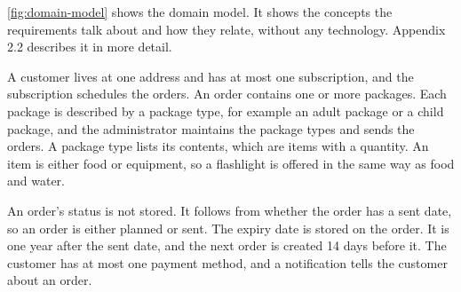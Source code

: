 \autoref{fig:domain-model} shows the domain model. It shows the concepts the
requirements talk about and how they relate, without any technology. Appendix 2.2
describes it in more detail.


A customer lives at one address and has at most one subscription, and the subscription
schedules the orders. An order contains one or more packages. Each package is
described by a package type, for example an adult package or a child package, and the
administrator maintains the package types and sends the orders. A package type lists
its contents, which are items with a quantity. An item is either food or equipment, so
a flashlight is offered in the same way as food and water.

An order's status is not stored. It follows from whether the order has a sent date, so
an order is either planned or sent. The expiry date is stored on the order. It is one
year after the sent date, and the next order is created 14 days before it. The
customer has at most one payment method, and a notification tells the customer about
an order.

